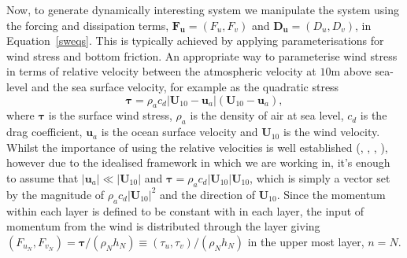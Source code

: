 \documentclass[10pt,a4paper]{report}
\newcommand*\equref[1]{Equation~\eqref{#1}}
\begin{document}
  Now, to generate dynamically interesting system we manipulate the system using 
  the forcing and
  dissipation terms, $\boldsymbol{F}_{\boldsymbol{u}} = \left(F_{u}, F_{v}\right)$ and $\boldsymbol{D}_{\boldsymbol{u}} = \left(D_{u}, D_{v}\right)$, in \equref{sweqs}.
  This is typically achieved by applying parameterisations for wind stress
  and bottom friction. An appropriate way to parameterise wind stress in terms of  
  relative velocity between the atmospheric velocity at $10 \mathrm{m}$ above sea-level
  and the sea surface velocity, for example as the quadratic stress
  \begin{equation}
  \boldsymbol{\tau}=\rho_{a} c_{d} \left|\boldsymbol{U}_{10}-\boldsymbol{u}_{a}\right|
  \left(\boldsymbol{U}_{10}-\boldsymbol{u}_{a}\right),
  \end{equation}
  where $\boldsymbol{\tau}$ is the surface wind stress, $\rho_{a}$ is the density of
  air at sea level, $c_{d}$ is the drag coefficient, $\boldsymbol{u}_{a}$ is the ocean
  surface velocity and $\boldsymbol{U}_{10}$ is the wind velocity.
  Whilst the importance of using the relative velocities is well established
  (\cite{duhaut2006wind}, \cite{zhai2007wind}, \cite{hughes2008wind}, \cite{zhai2012wind}), 
  however due to the idealised framework in which we are working in, it's enough
  to assume that $\left|\boldsymbol{u}_{a}\right| \ll \left|\boldsymbol{U}_{10}\right|$
  and $\boldsymbol{\tau}=\rho_{a} c_{d} \left|\boldsymbol{U}_{10}\right|
  \boldsymbol{U}_{10}$, which is simply a vector set by the 
  magnitude of $\rho_{a} c_{d} \left|\boldsymbol{U}_{10}\right|^{2}$ and the
  direction of $\boldsymbol{U}_{10}$. Since the momentum within each layer
  is defined to be constant with in each layer, the input of momentum from the wind
  is distributed through the layer giving $\left(F_{u_{N}},F_{v_{N}}\right)=\boldsymbol{\tau}/\left(\rho_{N}h_{N}\right) \equiv
  \left(\tau_{u},\tau_{v}\right)/\left(\rho_{N}h_{N}\right) $ in the
  upper most layer, $n=N$. 
  
\end{document}

